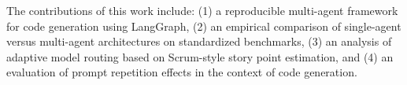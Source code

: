 The contributions of this work include: (1) a reproducible multi-agent framework for code generation using LangGraph, (2) an empirical comparison of single-agent versus multi-agent architectures on standardized benchmarks, (3) an analysis of adaptive model routing based on Scrum-style story point estimation, and (4) an evaluation of prompt repetition effects in the context of code generation.
